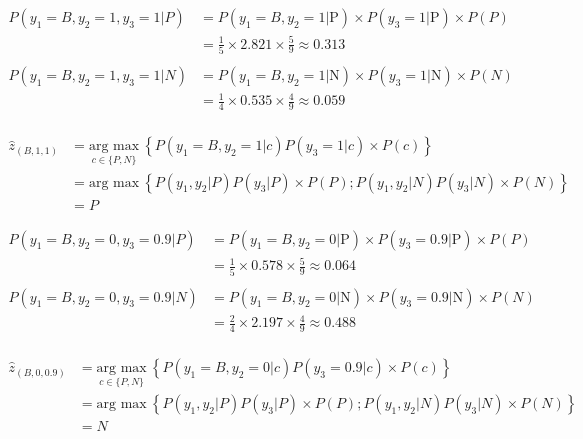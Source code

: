 \documentclass[12pt]{article}
\begin{document}
\begin{enumerate}[leftmargin=\labelsep]
    \begin{equation*}
        \begin{aligned}
        P(y_1 = B, y_2 = 1, y_3 = 1 | P) &= P(y_1 = B, y_2 = 1 | \text{P}) \times P(y_3 = 1 | \text{P}) \times P(P) \\
        &= \frac{1}{5} \times 2.821 \times \frac{5}{9} \approx 0.313\\
        \\
        P(y_1 = B, y_2 = 1, y_3 = 1 | N) &= P(y_1 = B, y_2 = 1 | \text{N}) \times P(y_3 = 1 | \text{N}) \times P(N) \\
        &= \frac{1}{4} \times 0.535 \times \frac{4}{9} \approx 0.059\\
        \end{aligned}
    \end{equation*}
    
    \begin{equation*}
        \begin{aligned}
            \hat{z}_{(B, 1, 1)} &= \underset{c \in \{P,N\}}{\text{arg max}} \medspace \left\{P(y_1 = B, y_2 = 1 | c) P(y_3 = 1| c) \times P(c)\right\}\\
                          & = \text{arg max} \medspace \left\{P(y_1, y_2 | P) P(y_3| P) \times P(P); P(y_1, y_2 | N) P(y_3| N) \times P(N)\right\} \\
                          & = P
        \end{aligned}
    \end{equation*}

    \begin{equation*}
        \begin{aligned}
        P(y_1 = B, y_2 = 0, y_3 = 0.9 | P) &= P(y_1 = B, y_2 = 0 | \text{P}) \times P(y_3 = 0.9 | \text{P}) \times P(P) \\
        &= \frac{1}{5} \times 0.578 \times \frac{5}{9} \approx 0.064\\
        \\
        P(y_1 = B, y_2 = 0, y_3 = 0.9 | N) &= P(y_1 = B, y_2 = 0 | \text{N}) \times P(y_3 = 0.9 | \text{N}) \times P(N) \\
        &= \frac{2}{4} \times 2.197 \times \frac{4}{9} \approx 0.488\\
        \end{aligned}
    \end{equation*}

    \begin{equation*}
        \begin{aligned}
            \hat{z}_{(B, 0, 0.9)} &= \underset{c \in \{P,N\}}{\text{arg max}} \medspace \left\{P(y_1 = B, y_2 = 0 | c) P(y_3 = 0.9| c) \times P(c)\right\}\\
                          & = \text{arg max} \medspace \left\{P(y_1, y_2 | P) P(y_3| P) \times P(P); P(y_1, y_2 | N) P(y_3| N) \times P(N)\right\} \\
                          & = N 
        \end{aligned}
    \end{equation*}


\end{enumerate}
\end{document}
